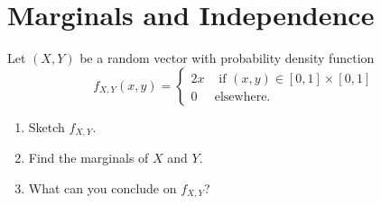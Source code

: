 \section{Marginals and Independence}

\begin{example}
Let $(X, Y)$ be a random vector with probability density function
    \[
        f_{X, Y} (x, y) = \left\lbrace \begin{matrix} 2 x & \text{ if } (x, y) \in [0, 1] \times [0, 1] \\
        0 & \text{elsewhere.} \end{matrix} \right.
    \]
\begin{enumerate}[label=\alph*)]
    \item Sketch $f_{X, Y}$.
    \item Find the marginals of $X$ and $Y$.
    \item What can you conclude on $f_{X, Y}$?
\end{enumerate}
\end{example}

